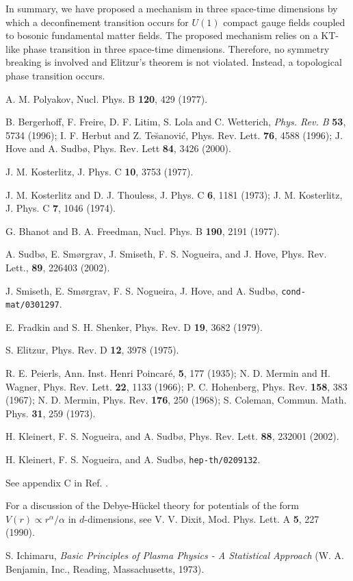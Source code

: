 \documentclass[a4paper,showpacs,preprintnumbers,amsmath,amssymb,prl,twocolumn]{revtex4}
\begin{document}
In summary, we have proposed a mechanism in three 
space-time dimensions by which a deconfinement 
transition occurs for $U(1)$ compact gauge fields coupled to 
bosonic fundamental matter fields. The proposed mechanism 
relies on a KT-like phase transition in three space-time dimensions. 
Therefore, no symmetry breaking is involved and Elitzur's theorem 
is not violated. Instead, a topological phase transition occurs.   

\begin{thebibliography}{100}

 A. M. Polyakov, Nucl. Phys. B {\bf 120}, 429
(1977).

 B. Bergerhoff, F. Freire, D. F. Litim, S. Lola and
C. Wetterich, {\it Phys. Rev. B} {\bf 53}, 5734 (1996); 
I. F. Herbut and Z. Te\u{s}anovi\'c,
Phys. Rev. Lett. {\bf 76}, 4588 (1996); J. Hove and A. Sudb{\o}, 
Phys. Rev. Lett {\bf 84}, 3426 (2000).

 J. M. Kosterlitz, J. Phys. C {\bf 10}, 3753 (1977).

 J. M. Kosterlitz and D. J. Thouless, 
J. Phys. C {\bf 6}, 1181 (1973); J. M. Kosterlitz, 
J. Phys. C {\bf 7}, 1046 (1974).

 G. Bhanot and B. A. Freedman, Nucl. Phys. B {\bf 190},
2191 (1977).

 A. Sudb{\o}, E. Sm{\o}rgrav, J. Smiseth, F. S. Nogueira,
and J. Hove, Phys. Rev. Lett., {\bf 89}, 226403 (2002). 
 
 J. Smiseth, E. Sm{\o}rgrav, F. S. Nogueira,
J. Hove, and A. Sudb{\o}, {\tt cond-mat/0301297}.

 E. Fradkin and S. H. Shenker, Phys. Rev. D
{\bf 19}, 3682 (1979).

 S. Elitzur, Phys. Rev. D {\bf 12}, 3978 (1975).

 R. E. Peierls, Ann. Inst. 
Henri Poincar{\'e}, {\bf 5}, 177 (1935);
N. D. Mermin and H. Wagner, Phys. Rev. Lett. {\bf 22}, 1133 (1966); 
P. C. Hohenberg, Phys. Rev. {\bf 158}, 383 (1967); 
N. D. Mermin, Phys. Rev. {\bf 176}, 250 (1968); 
S. Coleman, Commun. Math. Phys. {\bf 31}, 259 (1973).

 H. Kleinert, F. S. Nogueira, and A. Sudb{\o}, 
Phys. Rev. Lett. {\bf 88}, 232001 (2002).

 H. Kleinert, F. S. Nogueira, and A. Sudb{\o}, 
{\tt hep-th/0209132}. 

 See appendix C in Ref. \cite{KNS1}.

 For a discussion of the Debye-H\"uckel 
theory for potentials of the form $V(r)\propto r^{\alpha}/\alpha$ 
in $d$-dimensions, see 
V. V. Dixit, Mod. Phys. Lett. A {\bf 5}, 227 (1990).

 S. Ichimaru, {\it Basic Principles of Plasma 
Physics - A Statistical Approach} (W. A. Benjamin, Inc., Reading, 
Massachusetts, 1973).

\end{thebibliography}
\end{document}
